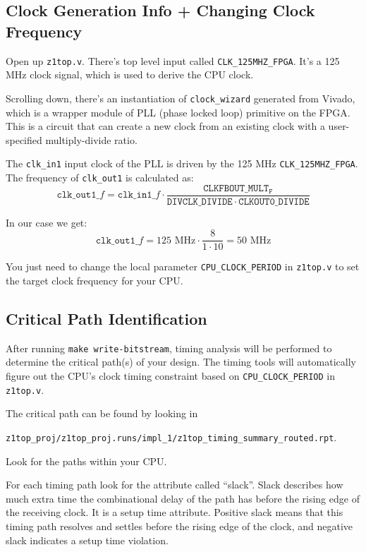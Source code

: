 \documentclass[11pt]{article}
\begin{document}
\subsection{Clock Generation Info + Changing Clock Frequency}
Open up \verb|z1top.v|.
There's top level input called \verb|CLK_125MHZ_FPGA|.
It's a 125 MHz clock signal, which is used to derive the CPU clock.

Scrolling down, there's an instantiation of \verb|clock_wizard| generated from Vivado, which is a wrapper module of PLL (phase locked loop) primitive on the FPGA.
This is a circuit that can create a new clock from an existing clock with a user-specified multiply-divide ratio.

The \verb|clk_in1| input clock of the PLL is driven by the 125 MHz \verb|CLK_125MHZ_FPGA|.
The frequency of \verb|clk_out1| is calculated as:
\begin{equation*}
  \mathtt{clk\_out1}\_f = \mathtt{clk\_in1}\_f \cdot \frac{\mathtt{CLKFBOUT\_MULT_F}}{\mathtt{DIVCLK\_DIVIDE} \cdot \mathtt{CLKOUT0\_DIVIDE}}
\end{equation*}

In our case we get:
\begin{equation*}
  \mathtt{clk\_out1}\_f = 125 \text{ MHz} \cdot \frac{8}{1 \cdot 10} = 50 \text{ MHz}
\end{equation*}

You just need to change the local parameter \verb|CPU_CLOCK_PERIOD| in \verb|z1top.v| to set the target clock frequency for your CPU.

\subsection{Critical Path Identification}
After running \verb|make write-bitstream|, timing analysis will be performed to determine the critical path(s) of your design.
The timing tools will automatically figure out the CPU's clock timing constraint based on \verb|CPU_CLOCK_PERIOD| in \verb|z1top.v|.

The critical path can be found by looking in

\verb|z1top_proj/z1top_proj.runs/impl_1/z1top_timing_summary_routed.rpt|.

Look for the paths within your CPU.

For each timing path look for the attribute called ``slack''.
Slack describes how much extra time the combinational delay of the path has before the rising edge of the receiving clock.
It is a setup time attribute.
Positive slack means that this timing path resolves and settles before the rising edge of the clock, and negative slack indicates a setup time violation.
\end{document}
